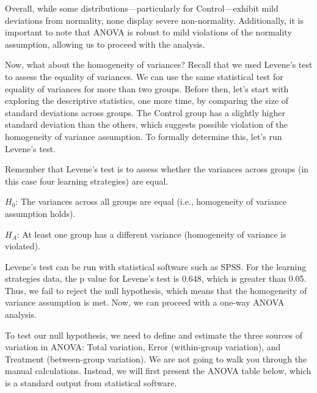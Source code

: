\documentclass[
  letterpaper,
  DIV=11,
  numbers=noendperiod]{scrreprt}
\begin{document}
Overall, while some distributions---particularly for Control---exhibit
mild deviations from normality, none display severe non-normality.
Additionally, it is important to note that ANOVA is robust to mild
violations of the normality assumption, allowing us to proceed with the
analysis.

Now, what about the homogeneity of variances? Recall that we used
Levene's test to assess the equality of variances. We can use the same
statistical test for equality of variances for more than two groups.
Before then, let's start with exploring the descriptive statistics, one
more time, by comparing the size of standard deviations across groups.
The Control group has a slightly higher standard deviation than the
others, which suggests possible violation of the homogeneity of variance
assumption. To formally determine this, let's run Levene's test.

Remember that Levene's test is to assess whether the variances across
groups (in this case four learning strategies) are equal.

\(H_0\): The variances across all groups are equal (i.e., homogeneity of
variance assumption holds).

\(H_A\): At least one group has a different variance (homogeneity of
variance is violated).

Levene's test can be run with statistical software such as SPSS. For the
learning strategies data, the p value for Levene's test is 0.648, which
is greater than 0.05. Thus, we fail to reject the null hypothesis, which
means that the homogeneity of variance assumption is met. Now, we can
proceed with a one-way ANOVA analysis.

To test our null hypothesis, we need to define and estimate the three
sources of variation in ANOVA: Total variation, Error (within-group
variation), and Treatment (between-group variation). We are not going to
walk you through the manual calculations. Instead, we will first present
the ANOVA table below, which is a standard output from statistical
software. \,
\end{document}
